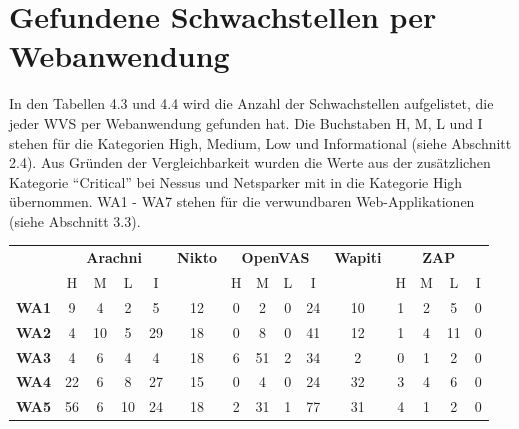\documentclass[12pt,oneside,a4paper,parskip,pointlessnumbers]{scrbook}
\begin{document}
  \section{Gefundene Schwachstellen per Webanwendung}
  In den Tabellen 4.3 und 4.4 wird die Anzahl der Schwachstellen aufgelistet, die jeder WVS per Webanwendung gefunden hat.  Die Buchstaben H, M, L und I stehen für die Kategorien High, Medium, Low und Informational (siehe Abschnitt 2.4). Aus Gründen der Vergleichbarkeit wurden die Werte aus der zusätzlichen Kategorie ``Critical'' bei Nessus und Netsparker mit in die Kategorie High übernommen. WA1 - WA7 stehen für die verwundbaren Web-Applikationen (siehe Abschnitt 3.3).
  \vspace{20pt}
     \begin{table}[H]
      \begin{tabular}{|r|c|c|c|c|c|c|c|c|c|c|c|c|c|c|}
        \cline{2-15}
        \multicolumn{1}{r|}{}       & \multicolumn{4}{c|}{\textbf{Arachni}} & \textbf{Nikto} & \multicolumn{4}{c|}{\textbf{OpenVAS}} & \textbf{Wapiti} & \multicolumn{4}{c|}{\textbf{ZAP}}  \\
        \cline{2-15}
        \multicolumn{1}{r|}{}       & H & M & L & I              &                & H & M & L & I              &                 & H & M & L & I                        \\
        \hline
        \textbf{WA1}      & 9    & 4    & 2   & 5                 & 12             & 0    & 2    & 0   & 24                & 10              & 1    & 2    & 5   & 0                           \\
        \hline
        \textbf{WA2}        & 4    & 10   & 5   & 29                & 18             & 0    & 8    & 0   & 41                & 12              & 1    & 4    & 11  & 0                           \\
        \hline
        \textbf{WA3}          & 4    & 6    & 4   & 4                 & 18             & 6    & 51   & 2   & 34                & 2               & 0    & 1    & 2   & 0                           \\
        \hline
        \textbf{WA4}    & 22   & 6    & 8   & 27                & 15             & 0    & 4    & 0   & 24                & 32              & 3    & 4    & 6   & 0                           \\
        \hline
        \textbf{WA5}             & 56   & 6    & 10  & 24                & 18             & 2    & 31   & 1   & 77                & 31              & 4    & 1    & 2   & 0                           \\

\end{tabular}
\end{table}
\end{document}

